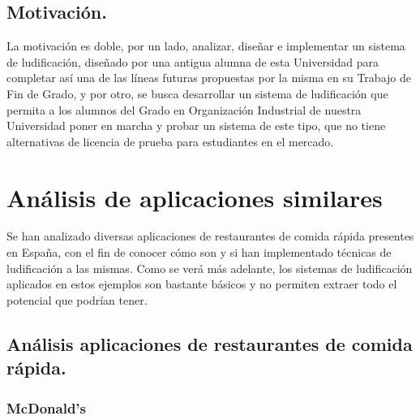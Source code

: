 \documentclass[twoside]{report}
\begin{document}
\subsection{Motivación.}

La motivación es doble, por un lado, analizar, diseñar e implementar un sistema de ludificación, diseñado por una antigua alumna de esta Universidad para completar así una de las líneas futuras propuestas por la misma en su Trabajo de Fin de Grado, y por otro, se busca desarrollar un sistema de ludificación que permita a los alumnos del Grado en Organización Industrial de nuestra Universidad poner en marcha y probar un sistema de este tipo, que no tiene alternativas de licencia de prueba para estudiantes en el mercado.

\section{Análisis de aplicaciones similares}

Se han analizado diversas aplicaciones de restaurantes de comida rápida presentes en España, con el fin de conocer cómo son y si han implementado técnicas de ludificación a las mismas. Como se verá más adelante, los sistemas de ludificación aplicados en estos ejemplos son bastante básicos y no permiten extraer todo el potencial que podrían tener.

\subsection{Análisis aplicaciones de restaurantes de comida rápida.}
\subsubsection{McDonald's}
\end{document}
